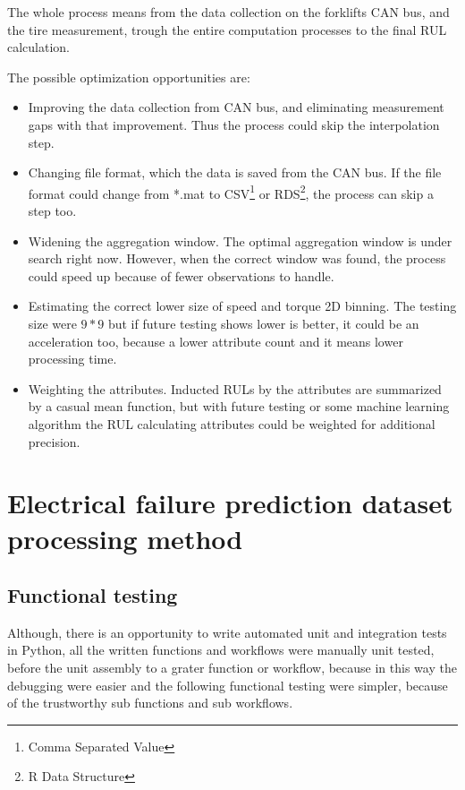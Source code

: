 The whole process means from the data collection on the forklifts CAN bus, and the tire measurement, trough the entire computation processes to the final RUL calculation.

The possible optimization opportunities are:
\begin{itemize}
	\item{Improving the data collection from CAN bus, and eliminating measurement gaps with that improvement.} Thus the process could skip the interpolation step. 
	\item{Changing file format, which the data is saved from the CAN bus.} If the file format could change from *.mat to CSV\footnote{Comma Separated Value} or RDS\footnote{R Data Structure}, the process can skip a step too.
	\item{Widening the aggregation window.} The optimal aggregation window is under search right now. However, when the correct window was found, the process could speed up because of fewer observations to handle.
	\item{Estimating the correct lower size of speed and torque 2D binning.} The testing size were $9*9$ but if future testing shows lower is better, it could be an acceleration too, because a lower attribute count and it means lower processing time.
	\item{Weighting the attributes.} Inducted RULs by the attributes are summarized by a casual mean function, but with future testing or some machine learning algorithm the RUL calculating attributes could be weighted for additional precision.
\end{itemize} 
\section{Electrical failure prediction dataset processing method}
\subsection{Functional testing}
Although, there is an opportunity to write automated unit and integration tests in Python, all the written functions and workflows were manually unit tested, before the unit assembly to a grater function or workflow, because in this way the debugging were easier and the following functional testing were simpler, because of the trustworthy sub functions and sub workflows.

